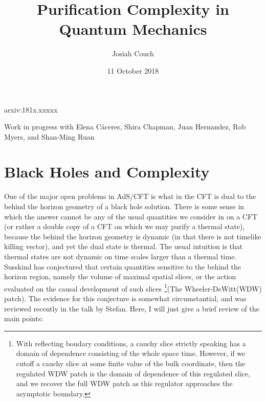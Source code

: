 \documentclass[12pt]{amsart}
\author{Josiah Couch}
\date{11 October 2018}
\begin{document}
\title{Purification Complexity in Quantum Mechanics}

\maketitle

\centerline{arxiv:181x.xxxxx}

\centerline{Work in progress with Elena C\'aceres, Shira Chapman, Juan Hernandez, Rob Myers, and Shan-Ming Ruan}

\tableofcontents

\section{Black Holes and Complexity}

One of the major open problems in AdS/CFT is what in the CFT is dual to the behind the horizon geometry of a black hole solution. There is some sense in which the answer cannot be any of the usual quantities we consider in on a CFT (or rather a double copy of a CFT on which we may purify a thermal state), because the behind the horizon geometry is dynamic (in that there is not timelike killing vector), and yet the dual state is thermal. The usual intuition is that thermal states are not dynamic on time scales larger than a thermal time. Susskind has conjectured that certain quantities sensitive to the behind the horizon  region, namely the volume of maximal spatial slices, or the action evaluated on the causal development of such slices \footnote{With reflecting boudary conditions, a cauchy slice strictly speaking has a domain of dependence consisting of the whole space time. However, if we cutoff a cauchy slice at some finite value of the bulk coordinate, then the regulated WDW patch is the domain of dependence of this regulated slice, and we recover the full WDW patch as this regulator approaches the asymptotic boundary.}(The Wheeler-DeWitt(WDW) patch). The evidence for this conjecture is somewhat circumstantial, and was reviewed recently in the talk by Stefan. Here, I will just give a brief review of the main points: 
\end{document}
